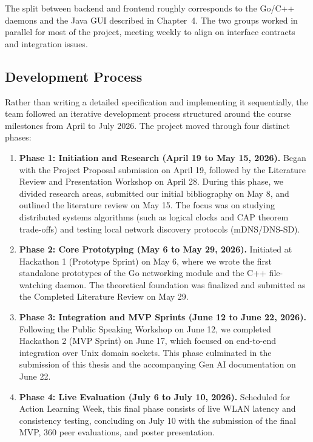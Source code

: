 The split between backend and frontend roughly corresponds to the Go/C++ daemons and the Java GUI described in Chapter~4. The two groups worked in parallel for most of the project, meeting weekly to align on interface contracts and integration issues.

\subsection{Development Process}

Rather than writing a detailed specification and implementing it sequentially, the team followed an iterative development process structured around the course milestones from April to July 2026. The project moved through four distinct phases:

\begin{enumerate}
    \item \textbf{Phase 1: Initiation and Research (April 19 to May 15, 2026).} Began with the Project Proposal submission on April 19, followed by the Literature Review and Presentation Workshop on April 28. During this phase, we divided research areas, submitted our initial bibliography on May 8, and outlined the literature review on May 15. The focus was on studying distributed systems algorithms (such as logical clocks and CAP theorem trade-offs) and testing local network discovery protocols (mDNS/DNS-SD).
    
    \item \textbf{Phase 2: Core Prototyping (May 6 to May 29, 2026).} Initiated at Hackathon 1 (Prototype Sprint) on May 6, where we wrote the first standalone prototypes of the Go networking module and the C++ file-watching daemon. The theoretical foundation was finalized and submitted as the Completed Literature Review on May 29.
    
    \item \textbf{Phase 3: Integration and MVP Sprints (June 12 to June 22, 2026).} Following the Public Speaking Workshop on June 12, we completed Hackathon 2 (MVP Sprint) on June 17, which focused on end-to-end integration over Unix domain sockets. This phase culminated in the submission of this thesis and the accompanying Gen AI documentation on June 22.
    
    \item \textbf{Phase 4: Live Evaluation (July 6 to July 10, 2026).} Scheduled for Action Learning Week, this final phase consists of live WLAN latency and consistency testing, concluding on July 10 with the submission of the final MVP, 360 peer evaluations, and poster presentation.
\end{enumerate}

